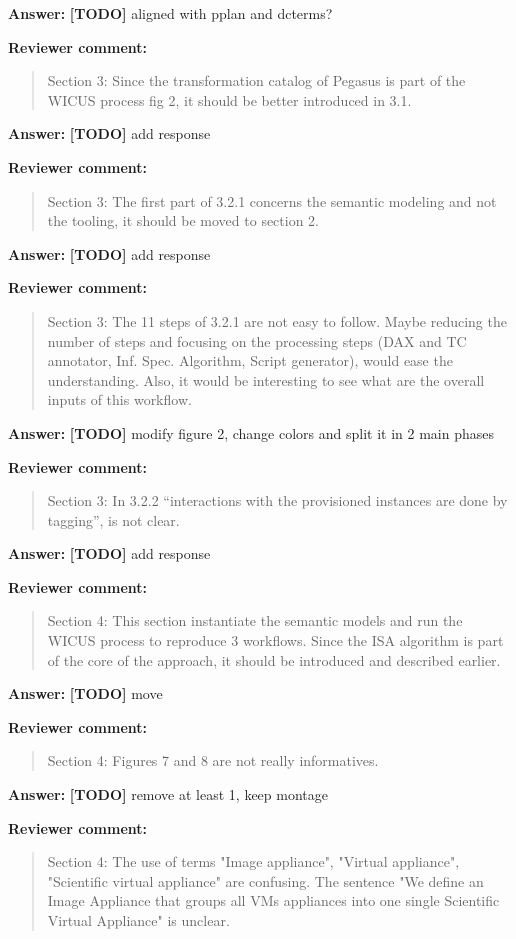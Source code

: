 \documentclass{letter}
\newenvironment{review}%
{\textbf{Reviewer comment:}\begin{quote}}%
{\end{quote}}%
\newcommand{\todo}[1]{%
      \color{red}\textbf{[TODO]} #1\color{black}}
\newcommand{\answer}[1]{%
      \textbf{Answer:} #1}
\begin{document}
\begin{letter}{}
\answer{\todo{aligned with pplan and dcterms?}}


\begin{review}
Section 3: Since the transformation catalog of Pegasus is part of the WICUS process fig 2, it should be better introduced in 3.1.
\end{review}

\answer{\todo{add response}}


\begin{review}
Section 3: The first part of 3.2.1 concerns the semantic modeling and not the tooling, it should be moved to section 2.
\end{review}

\answer{\todo{add response}}


\begin{review}
Section 3: The 11 steps of 3.2.1 are not easy to follow. Maybe reducing the number of steps and focusing on the processing steps (DAX and TC annotator, Inf. Spec. Algorithm, Script generator), would ease the understanding. Also, it would be interesting to see what are the overall inputs of this workflow.
\end{review}

\answer{\todo{modify figure 2, change colors and split it in 2 main phases}}


\begin{review}
Section 3: In 3.2.2 ``interactions with the provisioned instances are done by tagging'', is not clear.
\end{review}

\answer{\todo{add response}}


\begin{review}
Section 4: This section instantiate the semantic models and run the WICUS process to reproduce 3 workflows. Since the ISA algorithm is part of the core of the approach, it should be introduced and described earlier.
\end{review}

\answer{\todo{move}}


\begin{review}
Section 4: Figures 7 and 8 are not really informatives.
\end{review}

\answer{\todo{remove at least 1, keep montage}}


\begin{review}
Section 4: The use of terms "Image appliance", "Virtual appliance", "Scientific virtual appliance" are confusing. The sentence "We define an Image Appliance that groups all VMs appliances into one single Scientific Virtual Appliance" is unclear.
\end{review}


\end{letter}
\end{document}
